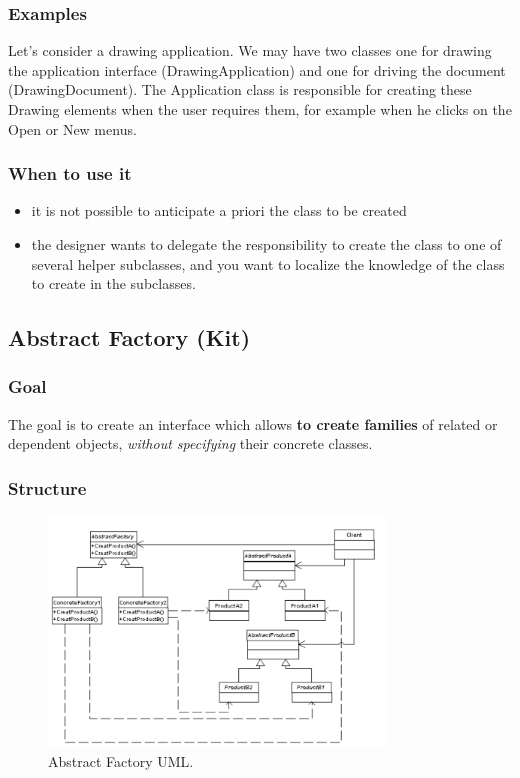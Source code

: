 \documentclass{article}
\begin{document}
\subsubsection{Examples}
Let's consider a drawing application. We may have two classes one for drawing the application interface (DrawingApplication) and one for driving the document (DrawingDocument). The Application class is responsible for creating these Drawing elements when the user requires them, for example when he clicks on the Open or New menus.

\subsubsection{When to use it}
\begin{itemize}
\item it is not possible to anticipate a priori the class to be created
\item the designer wants to delegate the responsibility to create the class to one of several helper subclasses, and you want to localize the knowledge of the class to create in the subclasses.
\end{itemize}

\subsection{Abstract Factory (Kit)}
\subsubsection{Goal}
The goal is to create an interface which allows \textbf{to create families} of related or dependent objects, \textit{without specifying} their concrete classes. 

\subsubsection{Structure}

\begin{figure}[h!]
  \centering
    \includegraphics[width=0.8\textwidth]{Img/AbstractFactoryUML.png}
     \caption{Abstract Factory UML.}
     \label{AbstractFactoryUML}
\end{figure}
\end{document}
